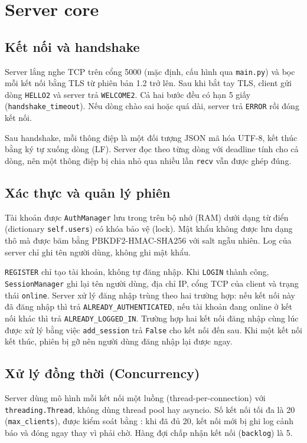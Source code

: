 \section{Server core}

\subsection{Kết nối và handshake}
Server lắng nghe TCP trên cổng 5000 (mặc định, cấu hình qua \texttt{main.py}) và bọc mỗi kết nối bằng TLS từ phiên bản 1.2 trở lên. Sau khi bắt tay TLS, client gửi dòng \texttt{HELLO2} và server trả \texttt{WELCOME2}. Cả hai bước đều có hạn 5 giấy (\texttt{handshake\_timeout}). Nếu dòng chào sai hoặc quá dài, server trả \texttt{ERROR} rồi đóng kết nối.

Sau handshake, mỗi thông điệp là một đối tượng JSON mã hóa UTF-8, kết thúc bằng ký tự xuống dòng (LF). Server đọc theo từng dòng với deadline tính cho cả dòng, nên một thông điệp bị chia nhỏ qua nhiều lần \texttt{recv} vẫn được ghép đúng.

\subsection{Xác thực và quản lý phiên}
Tài khoản được \texttt{AuthManager} lưu trong trên bộ nhớ (RAM) dưới dạng từ điển (dictionary \texttt{self.users}) có khóa bảo vệ (lock). Mật khẩu không được lưu dạng thô mà được băm bằng PBKDF2-HMAC-SHA256 với salt ngẫu nhiên. Log của server chỉ ghi tên người dùng, không ghi mật khẩu.

\texttt{REGISTER} chỉ tạo tài khoản, không tự đăng nhập. Khi \texttt{LOGIN} thành công, \texttt{SessionManager} ghi lại tên người dùng, địa chỉ IP, cổng TCP của client và trạng thái \texttt{online}. Server xử lý đăng nhập trùng theo hai trường hợp: nếu kết nối này đã đăng nhập thì trả \texttt{ALREADY\_AUTHENTICATED}, nếu tài khoản đang online ở kết nối khác thì trả \texttt{ALREADY\_LOGGED\_IN}. Trường hợp hai kết nối đăng nhập cùng lúc được xử lý bằng việc \texttt{add\_session} trả \texttt{False} cho kết nối đến sau. Khi một kết nối kết thúc, phiên bị gỡ nên người dùng đăng nhập lại được ngay.

\subsection{Xử lý đồng thời (Concurrency)}
Server dùng mô hình mỗi kết nối một luồng (thread-per-connection) với \texttt{threading.Thread}, không dùng thread pool hay asyncio. Số kết nối tối đa là 20 (\texttt{max\_clients}), được kiểm soát bằng : khi đã đủ 20, kết nối mới bị ghi log cảnh báo và đóng ngay thay vì phải chờ. Hàng đợi chấp nhận kết nối (\texttt{backlog}) là 5.

